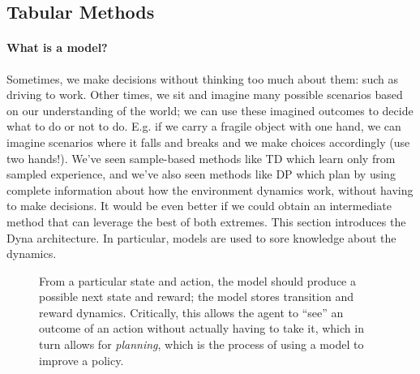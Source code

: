 \documentclass[12pt]{article}
\begin{document}
\subsection{Tabular Methods}
\paragraph{What is a model?} Sometimes, we make decisions without thinking too much about them: such as driving to work. Other times, we sit and imagine many possible scenarios based on our understanding of the world; we can use these imagined outcomes to decide what to do or not to do. E.g. if we carry a fragile object with one hand, we can imagine scenarios where it falls and breaks and we make choices accordingly (use two hands!). We've seen sample-based methods like TD which learn only from sampled experience, and we've also seen methods like DP which plan by using complete information about how the environment dynamics work, without having to make decisions. It would be even better if we could obtain an intermediate method that can leverage the best of both extremes. This section introduces the Dyna architecture. In particular, models are used to sore knowledge about the dynamics.

\begin{figure}[h]
  \centering
  \caption{\footnotesize From a particular state and action, the model should produce a possible next state and reward; the model stores transition and reward dynamics. Critically, this allows the agent to ``see'' an outcome of an action without actually having to take it, which in turn allows for \emph{planning}, which is the process of using a model to improve a policy.} 
\end{figure}
\end{document}

